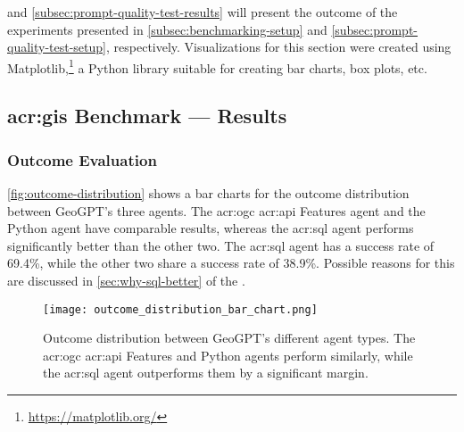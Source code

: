 \begin{comment}
Results should be clearly displayed and should provide a suitable representation of your results for the points you wish to make.
Graphs should be labelled in a legible font. If more than one result is displayed in the same graph, then these should be clearly marked.
Please choose carefully rather than presenting every result. Too much information is hard to read and often hides the key information you wish to present. Make use of statistical methods when presenting results, where possible to strengthen the results.
Further, the format of the presentation of results should be chosen based on what issues in the results you wish to highlight.
You may wish to present a subset in the experimental section and provide additional results in an appendix.
Point out specifics here but save the overall/general discussion to the Discussion chapter.
\end{comment}

 and \autoref{subsec:prompt-quality-test-results} will present the outcome of the experiments presented in \autoref{subsec:benchmarking-setup} and \autoref{subsec:prompt-quality-test-setup}, respectively. Visualizations for this section were created using Matplotlib,\footnote{\url{https://matplotlib.org/}} a Python library suitable for creating bar charts, box plots, etc.


\subsection[GIS Benchmark Experiment --- Results]{\acrshort{acr:gis} Benchmark --- Results}
\label{subsec:quantitative-results}

\subsubsection{Outcome Evaluation}

\autoref{fig:outcome-distribution} shows a bar charts for the outcome distribution between GeoGPT's three agents. The \acrshort{acr:ogc} \acrshort{acr:api} Features agent and the Python agent have comparable results, whereas the \acrshort{acr:sql} agent performs significantly better than the other two. The \acrshort{acr:sql} agent has a success rate of 69.4\%, while the other two share a success rate of 38.9\%. Possible reasons for this are discussed in \autoref{sec:why-sql-better} of the .

\begin{figure}[htbp]
    \centering
    \texttt{[image: outcome\_distribution\_bar\_chart.png]}
    \caption[Outcome distribution between GeoGPT's different agent types]{Outcome distribution between GeoGPT's different agent types. The \acrshort{acr:ogc} \acrshort{acr:api} Features and Python agents perform similarly, while the \acrshort{acr:sql} agent outperforms them by a significant margin.}
    \label{fig:outcome-distribution}
\end{figure}

